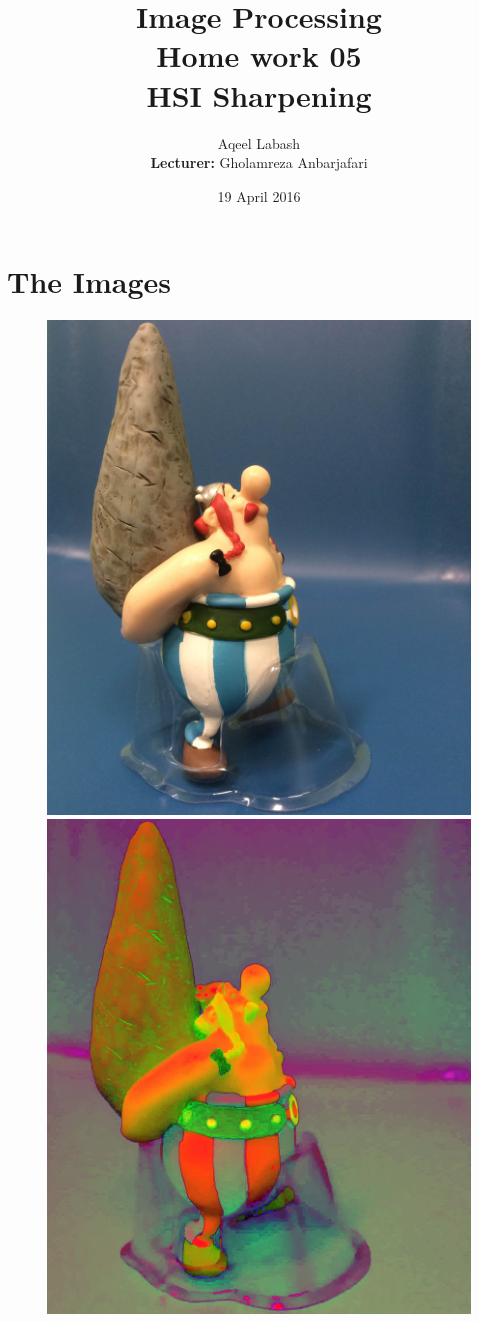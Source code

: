 \documentclass{article}
\title{Image Processing\\
	Home work 05\\HSI Sharpening  }
\author{Aqeel Labash\\ \textbf{Lecturer:} Gholamreza Anbarjafari}
\date{19 April 2016}
\begin{document}
	\maketitle
	\section*{The Images}

	\begin{figure}[H]
	\includegraphics[scale=0.1334]{Obelix.jpg}
	\includegraphics[scale=0.1]{obelx_hsv.jpg}

\end{figure}
\end{document}
